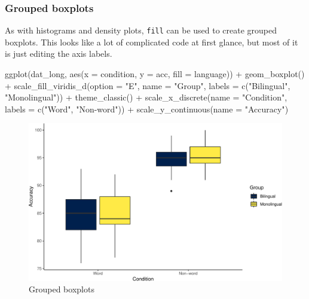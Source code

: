 \documentclass[
  english,
  doc,floatsintext]{apa6}
\newenvironment{Shaded}{\begin{snugshade}}{\end{snugshade}}
\newcommand{\AttributeTok}[1]{\textcolor[rgb]{0.77,0.63,0.00}{#1}}
\newcommand{\FunctionTok}[1]{\textcolor[rgb]{0.00,0.00,0.00}{#1}}
\newcommand{\NormalTok}[1]{#1}
\newcommand{\SpecialCharTok}[1]{\textcolor[rgb]{0.00,0.00,0.00}{#1}}
\newcommand{\StringTok}[1]{\textcolor[rgb]{0.31,0.60,0.02}{#1}}
\begin{document}
\hypertarget{grouped-boxplots}{%
\subsubsection{Grouped boxplots}\label{grouped-boxplots}}

As with histograms and density plots, \texttt{fill} can be used to create grouped boxplots. This looks like a lot of complicated code at first glance, but most of it is just editing the axis labels.

\begin{Shaded}
\begin{Highlighting}[]
\FunctionTok{ggplot}\NormalTok{(dat\_long, }\FunctionTok{aes}\NormalTok{(}\AttributeTok{x =}\NormalTok{ condition, }\AttributeTok{y =}\NormalTok{ acc, }\AttributeTok{fill =}\NormalTok{ language)) }\SpecialCharTok{+}
  \FunctionTok{geom\_boxplot}\NormalTok{() }\SpecialCharTok{+}
  \FunctionTok{scale\_fill\_viridis\_d}\NormalTok{(}\AttributeTok{option =} \StringTok{"E"}\NormalTok{,}
                       \AttributeTok{name =} \StringTok{"Group"}\NormalTok{,}
                       \AttributeTok{labels =} \FunctionTok{c}\NormalTok{(}\StringTok{"Bilingual"}\NormalTok{, }\StringTok{"Monolingual"}\NormalTok{)) }\SpecialCharTok{+}
  \FunctionTok{theme\_classic}\NormalTok{() }\SpecialCharTok{+}
  \FunctionTok{scale\_x\_discrete}\NormalTok{(}\AttributeTok{name =} \StringTok{"Condition"}\NormalTok{,}
                   \AttributeTok{labels =} \FunctionTok{c}\NormalTok{(}\StringTok{"Word"}\NormalTok{, }\StringTok{"Non{-}word"}\NormalTok{)) }\SpecialCharTok{+}
  \FunctionTok{scale\_y\_continuous}\NormalTok{(}\AttributeTok{name =} \StringTok{"Accuracy"}\NormalTok{)}
\end{Highlighting}
\end{Shaded}

\begin{figure}

{\centering \includegraphics[width=1\linewidth]{images/boxplot3-1} 

}

\caption{Grouped boxplots}\label{fig:boxplot3}
\end{figure}
\end{document}
